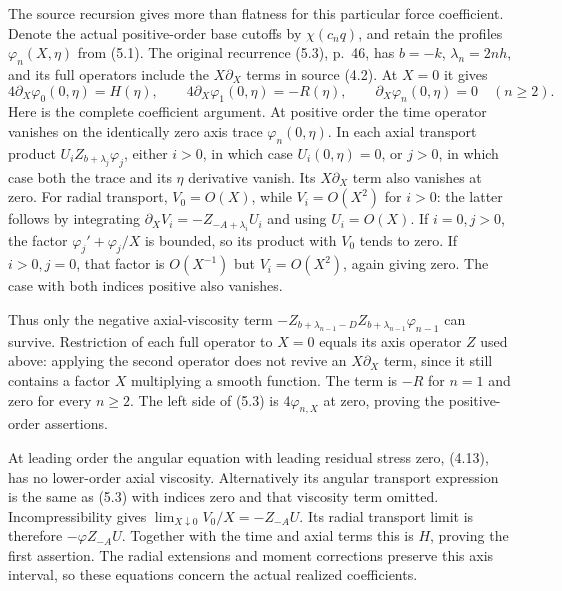 The source recursion gives more than flatness for this particular
force coefficient. Denote the actual positive-order base cutoffs by
\(\chi(c_nq)\), and retain the profiles \(\varphi_n(X,\eta)\)
from (5.1). The original recurrence (5.3), p.~46, has
\(b=-k\), \(\lambda_n=2nh\), and its full operators include
the \(X\partial_X\) terms in source (4.2). At \(X=0\) it gives
\begin{equation}\label{nsr:finite-radial-closure}
 4\partial_X\varphi_0(0,\eta)=H(\eta),\qquad
 4\partial_X\varphi_1(0,\eta)=-R(\eta),\qquad
 \partial_X\varphi_n(0,\eta)=0\quad(n\geq2).
\end{equation}
Here is the complete coefficient argument. At positive order the
time operator vanishes on the identically zero axis trace
\(\varphi_n(0,\eta)\). In each axial transport product
\(U_i Z_{b+\lambda_j}\varphi_j\), either \(i>0\), in which
case \(U_i(0,\eta)=0\), or \(j>0\), in which case both
the trace and its \(\eta\) derivative vanish. Its
\(X\partial_X\) term also vanishes at zero. For radial transport,
\(V_0=O(X)\), while \(V_i=O(X^2)\) for \(i>0\): the latter
follows by integrating \(\partial_XV_i=-Z_{-A+\lambda_i}U_i\)
and using \(U_i=O(X)\). If \(i=0,j>0\), the factor
\(\varphi_j'+\varphi_j/X\) is bounded, so its product with
\(V_0\) tends to zero. If \(i>0,j=0\), that factor is
\(O(X^{-1})\) but \(V_i=O(X^2)\), again giving zero.
The case with both indices positive also vanishes.

Thus only the negative axial-viscosity term
\(-Z_{b+\lambda_{n-1}-D}Z_{b+\lambda_{n-1}}\varphi_{n-1}\)
can survive. Restriction of each full operator to \(X=0\)
equals its axis operator \(Z\) used above: applying the second
operator does not revive an \(X\partial_X\) term, since it
still contains a factor \(X\) multiplying a smooth function.
The term is \(-R\) for \(n=1\) and zero for every \(n\geq2\).
The left side of (5.3) is \(4\varphi_{n,X}\) at zero,
proving the positive-order assertions.

At leading order the angular equation with leading residual stress
zero, (4.13), has no lower-order axial viscosity. Alternatively its
angular transport expression is the same as (5.3) with indices zero
and that viscosity term omitted. Incompressibility gives
\(\lim_{X\downarrow0}V_0/X=-Z_{-A}U\). Its radial transport
limit is therefore \(-\varphi Z_{-A}U\). Together with the time
and axial terms this is \(H\), proving the first assertion.
The radial extensions and moment corrections preserve this axis
interval, so these equations concern the actual realized coefficients.

